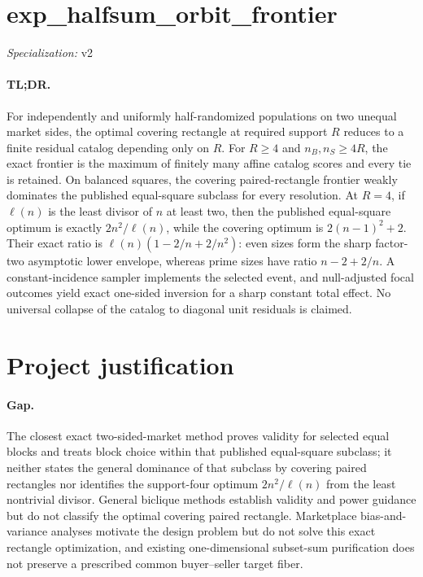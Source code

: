 \documentclass{article}
\begin{document}
\sloppy

\section*{exp\_\allowbreak{}halfsum\_\allowbreak{}orbit\_\allowbreak{}frontier}

\noindent\textit{Specialization:} v2\par

\paragraph{TL;DR.} For independently and uniformly half-randomized populations on two unequal market sides, the optimal covering rectangle at required support \(R\) reduces to a finite residual catalog depending only on \(R\). For \(R\ge4\) and \(n_B,n_S\ge4R\), the exact frontier is the maximum of finitely many affine catalog scores and every tie is retained. On balanced squares, the covering paired-rectangle frontier weakly dominates the published equal-square subclass for every resolution. At \(R=4\), if \(\ell(n)\) is the least divisor of \(n\) at least two, then the published equal-square optimum is exactly \(2n^2/\ell(n)\), while the covering optimum is \(2(n-1)^2+2\). Their exact ratio is \(\ell(n)(1-2/n+2/n^2)\): even sizes form the sharp factor-two asymptotic lower envelope, whereas prime sizes have ratio \(n-2+2/n\). A constant-incidence sampler implements the selected event, and null-adjusted focal outcomes yield exact one-sided inversion for a sharp constant total effect. No universal collapse of the catalog to diagonal unit residuals is claimed.

\section{Project justification}

\paragraph{Gap.} The closest exact two-sided-market method proves validity for selected equal blocks and treats block choice within that published equal-square subclass; it neither states the general dominance of that subclass by covering paired rectangles nor identifies the support-four optimum \(2n^2/\ell(n)\) from the least nontrivial divisor. General biclique methods establish validity and power guidance but do not classify the optimal covering paired rectangle. Marketplace bias-and-variance analyses motivate the design problem but do not solve this exact rectangle optimization, and existing one-dimensional subset-sum purification does not preserve a prescribed common buyer--seller target fiber.
\end{document}
